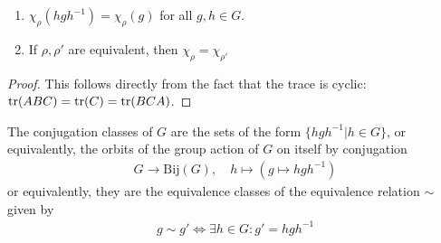 \begin{thm}[]
\begin{enumerate}
  \item $\chi_{\rho}(hgh^{-1}) = \chi_{\rho}(g)$ for all $g,h \in G$.
  \item If $\rho, \rho'$ are equivalent, then $\chi_{\rho} = \chi_{\rho'}$
\end{enumerate}
\end{thm}
\begin{proof}
  This follows directly from the fact that the trace is cyclic: $\operatorname{tr}(ABC) = \operatorname{tr}(C) = \operatorname{tr}(BCA)$.
\end{proof}


\begin{dfn}[]
The conjugation classes of $G$ are the sets of the form $\{hgh^{-1}\big\vert h \in G\}$, 
or equivalently, the orbits of the group action of $G$ on itself by conjugation
\begin{align*}
  G \to \text{Bij}(G), \quad h \mapsto ( g \mapsto  hgh^{-1})
\end{align*}
or equivalently, they are the equivalence classes of the equivalence relation $\sim$ given by
\begin{align*}
  g \sim g' \iff \exists h \in G: g' = hgh^{-1}
\end{align*}
\end{dfn}





































